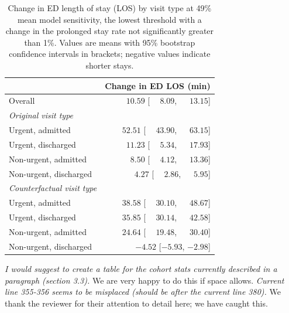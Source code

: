 \begin{table}[htbp]
\centering
\small
\caption{Change in ED length of stay (LOS) by visit type at 49\% mean model sensitivity, the lowest threshold with a change in the prolonged stay rate not significantly greater than 1\%. Values are means with 95\% bootstrap confidence intervals in brackets; negative values indicate shorter stays.}
\label{tab:los_visit_type_0.01}
\begin{tabular}{lr}
\toprule
 & Change in ED LOS (min) \\
\midrule
Overall & $\phantom{-}10.59$ [$\phantom{-}8.09$, $\phantom{-}13.15$] \\
\addlinespace
\textit{Original visit type} & \\
\quad Urgent, admitted & $\phantom{-}52.51$ [$\phantom{-}43.90$, $\phantom{-}63.15$] \\
\quad Urgent, discharged & $\phantom{-}11.23$ [$\phantom{-}5.34$, $\phantom{-}17.93$] \\
\quad Non-urgent, admitted & $\phantom{-}8.50$ [$\phantom{-}4.12$, $\phantom{-}13.36$] \\
\quad Non-urgent, discharged & $\phantom{-}4.27$ [$\phantom{-}2.86$, $\phantom{-}5.95$] \\
\addlinespace
\textit{Counterfactual visit type} & \\
\quad Urgent, admitted & $\phantom{-}38.58$ [$\phantom{-}30.10$, $\phantom{-}48.67$] \\
\quad Urgent, discharged & $\phantom{-}35.85$ [$\phantom{-}30.14$, $\phantom{-}42.58$] \\
\quad Non-urgent, admitted & $\phantom{-}24.64$ [$\phantom{-}19.48$, $\phantom{-}30.40$] \\
\quad Non-urgent, discharged & $-4.52$ [$-5.93$, $-2.98$] \\
\bottomrule
\end{tabular}
\end{table}


\textit{     I would suggest to create a table for the cohort stats currently described in a paragraph (section 3.3).}
We are very happy to do this if space allows.
\textit{
     Current line 355-356 seems to be misplaced (should be after the current line 380).}
We thank the reviewer for their attention to detail here; we have caught this.

